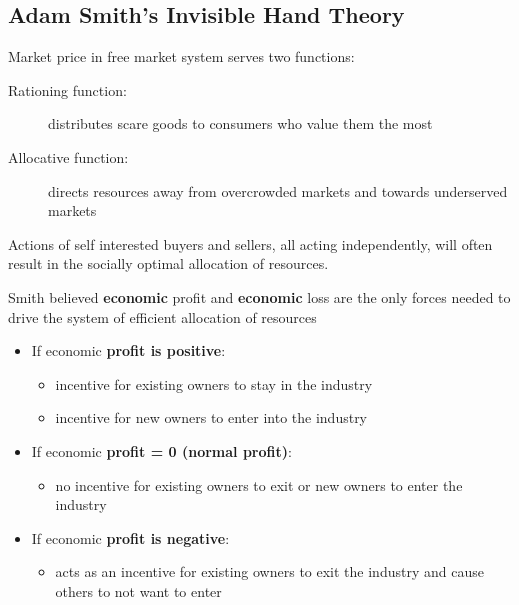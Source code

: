 \subsection{Adam Smith's Invisible Hand Theory}
Market price in free market system serves two functions:
\begin{description}
	\item[Rationing function:] distributes scare goods to consumers who value them the most
	\item[Allocative function:] directs resources away from overcrowded markets and towards underserved markets
\end{description}
\begin{leftbar}
	Actions of self interested buyers and sellers, all acting independently, will often result in the socially optimal allocation of resources.
\end{leftbar}
Smith believed \textbf{economic} profit and \textbf{economic} loss are the only forces needed to drive the system of efficient allocation of resources
\begin{itemize}
	\item If economic \textbf{profit is positive}:
	\begin{itemize}
		\item incentive for existing owners to stay in the industry
		\item incentive for new owners to enter into the industry
	\end{itemize}
	\item If economic \textbf{profit = 0 (normal profit)}:
	\begin{itemize}
		\item no incentive for existing owners to exit or new owners to enter the industry
	\end{itemize}
	\item If economic \textbf{profit is negative}:
	\begin{itemize}
		\item acts as an incentive for existing owners to exit the industry and cause others to not want to enter
	\end{itemize}
\end{itemize}